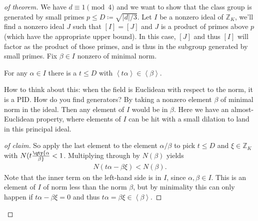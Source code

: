 \begin{proof}[of theorem]

We have \(d \equiv 1 \pmod 4\) and we want to show that the class group
is generated by small primes
\(p\leq D\coloneqq\sqrt{ {\left\lvert {d} \right\rvert} / 3 }\). Let
\(I\) be a nonzero ideal of \({\mathbb{Z}}_K\), we'll find a nonzero
ideal \(J\) such that \([I] = [J]\) and \(J\) is a product of primes
above \(p\) (which have the appropriate upper bound). In this case,
\([J]\) and thus \([I]\) will factor as the product of those primes, and
is thus in the subgroup generated by small primes. Fix \(\beta\in I\)
nonzero of minimal norm.

\begin{claim}

For any \(\alpha \in I\) there is a \(t\leq D\) with
\(\left\langle{ t \alpha }\right\rangle \in \left\langle{ \beta }\right\rangle\).

\end{claim}

\begin{remark}

How to think about this: when the field is Euclidean with respect to the
norm, it is a PID. How do you find generators? By taking a nonzero
element \(\beta\) of minimal norm in the ideal. Then any element of
\(I\) would be in \(\beta\). Here we have an almost-Euclidean property,
where elements of \(I\) can be hit with a small dilation to land in this
principal ideal.

\end{remark}

\begin{proof}[of claim]

So apply the last element to the element \(\alpha/ \beta\) to pick
\(t\leq D\) and \(\xi \in {\mathbb{Z}}_K\) with
\(N( t \qty{\alpha\over \beta} < 1\). Multiplying through by
\(N( \beta)\) yields
\begin{align*}
N ( t \alpha - \beta\xi ) < N( \beta )
.\end{align*}
Note that the inner term on the left-hand side is in \(I\), since
\(\alpha, \beta\in I\). This is an element of \(I\) of norm less than
the norm \(\beta\), but by minimality this can only happen if
\(t \alpha - \beta\xi =0\) and thus
\(t \alpha = \beta\xi \in \left\langle{ \beta }\right\rangle\).

\end{proof}


\end{proof}
